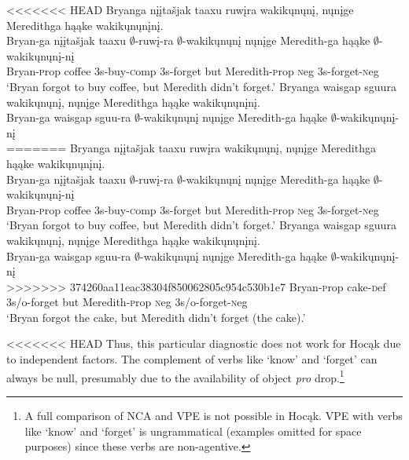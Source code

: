 \documentclass[output=paper]{LSP/langsci}
\begin{document}
\begin{exe}
\ex
\begin{xlist}
\ex
<<<<<<< HEAD
\glll Bryanga {nįįtašjak taaxu} ruwįra wakikųnųnį, nųnįge Meredithga hąąke wakikųnųnįnį.\\
Bryan-ga {nįįtašjak taaxu} $\emptyset$-ruwį-ra $\emptyset$-wakikųnųnį nųnįge Meredith-ga hąąke $\emptyset$-wakikųnųnį-nį\\
Bryan-{\textsc prop} coffee {\textsc 3s}-buy-{\textsc comp} {\textsc 3s}-forget but Meredith-{\textsc prop} {\textsc neg} {\textsc 3s}-forget-{\textsc neg}\\
\trans `Bryan forgot to buy coffee, but Meredith didn't forget.'
\ex
\glll Bryanga {waisgap sguura} wakikųnųnį, nųnįge Meredithga hąąke wakikųnųnįnį.\\
Bryan-ga {waisgap sguu-ra} $\emptyset$-wakikųnųnį nųnįge Meredith-ga hąąke $\emptyset$-wakikųnųnį-nį\\
=======
\glll Bryanga {n\k{i}\k{i}ta\v{s}jak taaxu} ruw\k{i}ra wakik\k{u}n\k{u}n\k{i}, n\k{u}n\k{i}ge Meredithga h\k{a}\k{a}ke wakik\k{u}n\k{u}n\k{i}n\k{i}.\\
Bryan-ga {n\k{i}\k{i}ta\v{s}jak taaxu} $\emptyset$-ruw\k{i}-ra $\emptyset$-wakik\k{u}n\k{u}n\k{i} n\k{u}n\k{i}ge Meredith-ga h\k{a}\k{a}ke $\emptyset$-wakik\k{u}n\k{u}n\k{i}-n\k{i}\\
Bryan-{\textsc prop} coffee {\textsc 3s}-buy-{\textsc comp} {\textsc 3s}-forget but Meredith-{\textsc prop} {\textsc neg} {\textsc 3s}-forget-{\textsc neg}\\
\trans `Bryan forgot to buy coffee, but Meredith didn't forget.'
\ex
\glll Bryanga {waisgap sguura} wakik\k{u}n\k{u}n\k{i}, n\k{u}n\k{i}ge Meredithga h\k{a}\k{a}ke wakik\k{u}n\k{u}n\k{i}n\k{i}.\\
Bryan-ga {waisgap sguu-ra} $\emptyset$-wakik\k{u}n\k{u}n\k{i} n\k{u}n\k{i}ge Meredith-ga h\k{a}\k{a}ke $\emptyset$-wakik\k{u}n\k{u}n\k{i}-n\k{i}\\
>>>>>>> 374260aa11eac38304f850062805c954c530b1e7
Bryan-{\textsc prop} cake-{\textsc def} {\textsc 3s/o}-forget but Meredith-{\textsc prop} {\textsc neg} {\textsc 3s/o}-forget-{\textsc neg}\\
\trans `Bryan forgot the cake, but Meredith didn't forget (the cake).'
\end{xlist}
\end{exe}


<<<<<<< HEAD
Thus, this particular diagnostic does not work for Hocąk due to independent factors. The complement of verbs like `know' and `forget' can always be null, presumably due to the availability of object \emph{pro} drop.\footnote{A full comparison of NCA and VPE is not possible in Hocąk. VPE with verbs like `know' and `forget' is ungrammatical (examples omitted for space purposes) since these verbs are non-agentive.}
\end{document}
